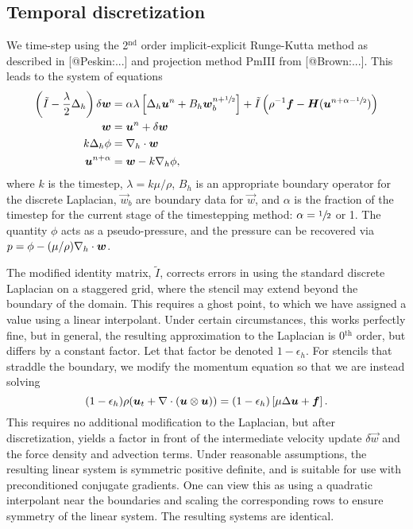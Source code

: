 \subsection{Temporal discretization}

We time-step using the 2$^\text{nd}$ order implicit-explicit Runge-Kutta method
as described in [@Peskin:...] and projection method PmIII from [@Brown:...].
This leads to the system of equations
\begin{align}
    \left(\tilde{I}-\frac{\lambda}2\Delta_h\right)\delta\boldsymbol{w}
    &= \alpha\lambda\left[\Delta_h\boldsymbol{u}^n + B_h \boldsymbol{w}_b^{n+\sfrac12}\right] + \tilde{I}\left(\rho^{-1}\boldsymbol{f} - \boldsymbol{H}(\boldsymbol{u}^{n+\alpha-\sfrac12})\right) \\
    \boldsymbol{w} &= \boldsymbol{u}^n + \delta\boldsymbol{w} \\
    k\Delta_h\phi &= \nabla_h\cdot\boldsymbol{w} \\
    \boldsymbol{u}^{n+\alpha} &= \boldsymbol{w} - k\nabla_h\phi,
\end{align}
where $k$ is the timestep, $\lambda = k\mu/\rho$, $B_h$ is an appropriate
boundary operator for the discrete Laplacian, $\vec{w}_b$ are boundary data for
$\vec{w}$, and $\alpha$ is the fraction of the timestep for the current stage
of the timestepping method: $\alpha=\sfrac12$ or 1. The quantity $\phi$ acts as
a pseudo-pressure, and the pressure can be recovered via
$p=\phi-(\mu/\rho)\nabla_h\cdot\boldsymbol{w}$.

The modified identity matrix, $\tilde{I}$, corrects errors in using the
standard discrete Laplacian on a staggered grid, where the stencil may extend
beyond the boundary of the domain. This requires a ghost point, to which we
have assigned a value using a linear interpolant. Under certain circumstances,
this works perfectly fine, but in general, the resulting approximation to the
Laplacian is 0$^\text{th}$ order, but differs by a constant factor. Let that
factor be denoted $1-\epsilon_h$. For stencils that straddle the boundary, we
modify the momentum equation so that we are instead solving
\begin{equation}
    (1-\epsilon_h)\rho(\boldsymbol{u}_t + \nabla\cdot(\boldsymbol{u}\otimes\boldsymbol{u})) = (1-\epsilon_h)\left[\mu\Delta\boldsymbol{u} + \boldsymbol{f}\right].
\end{equation}
This requires no additional modification to the Laplacian, but after
discretization, yields a factor in front of the intermediate velocity update
$\delta\vec{w}$ and the force density and advection terms. Under reasonable
assumptions, the resulting linear system is symmetric positive definite, and
is suitable for use with preconditioned conjugate gradients. One can view this
as using a quadratic interpolant near the boundaries and scaling the
corresponding rows to ensure symmetry of the linear system. The resulting
systems are identical.
